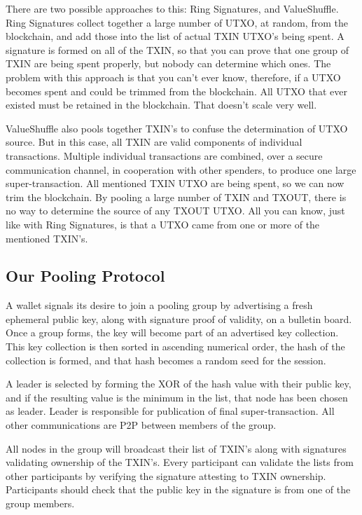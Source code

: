 \documentclass[a4paper, 10pt, conference]{ieeeconf}
\begin{document}
There are two possible approaches to this: Ring Signatures, and ValueShuffle. Ring Signatures collect together a large number of UTXO, at random, from the blockchain, and add those into the list of actual TXIN UTXO's being spent. A signature is formed on all of the TXIN, so that you can prove that one group of TXIN are being spent properly, but nobody can determine which ones. The problem with this approach is that you can't ever know, therefore, if a UTXO becomes spent and could be trimmed from the blockchain. All UTXO that ever existed must be retained in the blockchain. That doesn't scale very well.

ValueShuffle also pools together TXIN's to confuse the determination of UTXO source. But in this case, all TXIN are valid components of individual transactions. Multiple individual transactions are combined, over a secure communication channel, in cooperation with other spenders, to produce one large super-transaction. All mentioned TXIN UTXO are being spent, so we can now trim the blockchain. By pooling a large number of TXIN and TXOUT, there is no way to determine the source of any TXOUT UTXO. All you can know, just like with Ring Signatures, is that a UTXO came from one or more of the mentioned TXIN's.

\subsection{Our Pooling Protocol}
A wallet signals its desire to join a pooling group by advertising a fresh ephemeral public key, along with signature proof of validity, on a bulletin board. Once a group forms, the key will become part of an advertised key collection. This key collection is then sorted in ascending numerical order, the hash of the collection is formed, and that hash becomes a random seed for the session.

A leader is selected by forming the XOR of the hash value with their public key, and if the resulting value is the minimum in the list, that node has been chosen as leader. Leader is responsible for publication of final super-transaction. All other communications are P2P between members of the group.

All nodes in the group will broadcast their list of TXIN's along with signatures validating ownership of the TXIN's. Every participant can validate the lists from other participants by verifying the signature attesting to TXIN ownership. Participants should check that the public key in the signature is from one of the group members.
\end{document}
